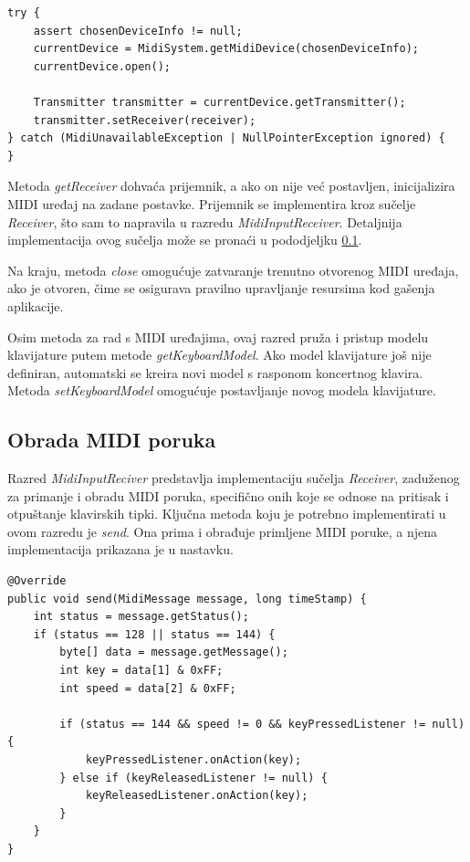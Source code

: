 \documentclass[diplomskirad, upload]{fer}
\begin{document}
\begin{lstlisting}
try {
	assert chosenDeviceInfo != null;
	currentDevice = MidiSystem.getMidiDevice(chosenDeviceInfo);
	currentDevice.open();
	
	Transmitter transmitter = currentDevice.getTransmitter();
	transmitter.setReceiver(receiver);
} catch (MidiUnavailableException | NullPointerException ignored) {
}
\end{lstlisting}

Metoda \textit{getReceiver} dohvaća prijemnik, a ako on nije već postavljen, inicijalizira MIDI uređaj na zadane postavke. Prijemnik se implementira kroz sučelje \textit{Receiver}, što sam to napravila u razredu \textit{MidiInputReceiver}. Detaljnija implementacija ovog sučelja može se pronaći u pododjeljku \ref{sec:midimessages}.

Na kraju, metoda \textit{close} omogućuje zatvaranje trenutno otvorenog MIDI uređaja, ako je otvoren, čime se osigurava pravilno upravljanje resursima kod gašenja aplikacije.

Osim metoda za rad s MIDI uređajima, ovaj razred pruža i pristup modelu klavijature putem metode \textit{getKeyboardModel}. Ako model klavijature još nije definiran, automatski se kreira novi model s rasponom koncertnog klavira. Metoda \textit{setKeyboardModel} omogućuje postavljanje novog modela klavijature.

\subsection{Obrada MIDI poruka}
\label{sec:midimessages}
Razred \textit{MidiInputReciver} predstavlja implementaciju sučelja \textit{Receiver}, zaduženog za primanje i obradu MIDI poruka, specifično onih koje se odnose na pritisak i otpuštanje klavirskih tipki. Ključna metoda koju je potrebno implementirati u ovom razredu je \textit{send}. Ona prima i obrađuje primljene MIDI poruke, a njena implementacija prikazana je u nastavku.

\begin{lstlisting}
@Override
public void send(MidiMessage message, long timeStamp) {
	int status = message.getStatus();
	if (status == 128 || status == 144) {
		byte[] data = message.getMessage();
		int key = data[1] & 0xFF;
		int speed = data[2] & 0xFF;

		if (status == 144 && speed != 0 && keyPressedListener != null) {
			keyPressedListener.onAction(key);
		} else if (keyReleasedListener != null) {
			keyReleasedListener.onAction(key);
		}
	}
}
\end{lstlisting}
\end{document}
